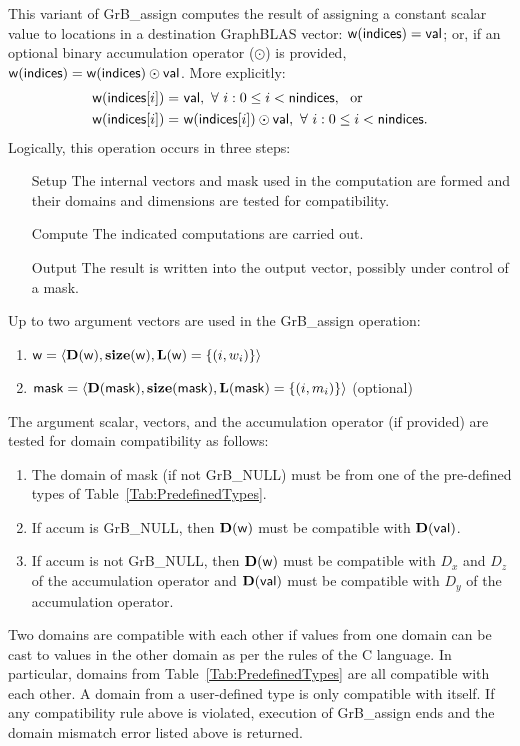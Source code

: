 This variant of {\sf GrB\_assign} computes the result of assigning a constant
scalar value to locations in a destination GraphBLAS vector: 
${\sf w}({\sf indices}) = {\sf val}$; or, if an optional binary accumulation 
operator ($\odot$) is provided, 
${\sf w}({\sf indices}) = {\sf w}({\sf indices}) \odot {\sf val}$.  
More explicitly:
\[
\begin{aligned}
	{\sf w}({\sf indices}[i]) = &\ {\sf val}, \ 
    \forall \  i : 0 \leq i < {\sf nindices}, \mbox{~~or~~} \\
    {\sf w}({\sf indices}[i]) = &\ {\sf w}({\sf indices}[i]) \odot {\sf val}, \ 
    \forall \  i : 0 \leq i < {\sf nindices}.
\end{aligned}
\]  
Logically, this operation occurs in three steps:
\begin{enumerate}[leftmargin=0.75in]
\item[Setup] The internal vectors and mask used in the computation are formed 
and their domains and dimensions are tested for compatibility.
\item[Compute] The indicated computations are carried out.
\item[Output] The result is written into the output vector, possibly under 
control of a mask.
\end{enumerate}

Up to two argument vectors are used in the {\sf GrB\_assign} operation:
\begin{enumerate}
	\item ${\sf w} = \langle \bold{D}({\sf w}),\bold{size}({\sf w}),
    \bold{L}({\sf w}) = \{(i,w_i) \} \rangle$
    
	\item ${\sf mask} = \langle \bold{D}({\sf mask}),\bold{size}({\sf mask}),
    \bold{L}({\sf mask}) = \{(i,m_i) \} \rangle$ (optional)
\end{enumerate}

The argument scalar, vectors, and the accumulation 
operator (if provided) are tested for domain compatibility as follows:
\begin{enumerate}
	\item The domain of {\sf mask} (if not {\sf GrB\_NULL}) must be from one of 
    the pre-defined types of Table~\ref{Tab:PredefinedTypes}.

	\item If {\sf accum} is {\sf GrB\_NULL}, then $\bold{D}({\sf w})$ must be 
    compatible with $\bold{D}({\sf val})$.

	\item If {\sf accum} is not {\sf GrB\_NULL}, then $\bold{D}({\sf w})$ must be
    compatible with $D_x$ and $D_z$ of the accumulation operator and 
    $\bold{D}({\sf val})$ must be compatible with $D_y$ of the accumulation operator.
\end{enumerate}
Two domains are compatible with each other if values from one domain can be cast 
to values in the other domain as per the rules of the C language.
In particular, domains from Table~\ref{Tab:PredefinedTypes} are all compatible 
with each other. A domain from a user-defined type is only compatible with itself.
If any compatibility rule above is violated, execution of {\sf GrB\_assign} ends
and the domain mismatch error listed above is returned.

